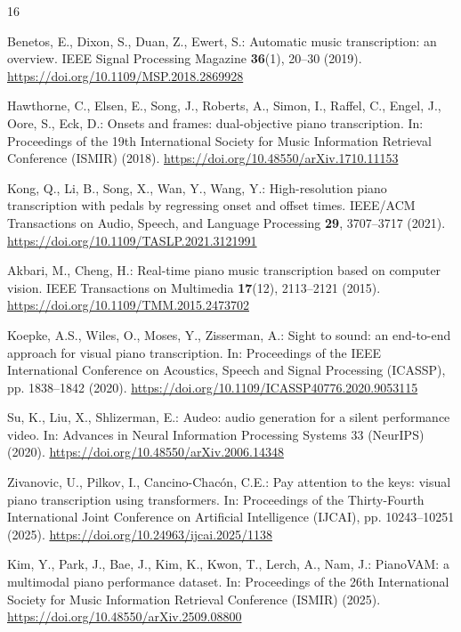\documentclass[pdflatex,sn-mathphys-num]{sn-jnl}
\begin{document}
\begin{thebibliography}{16}

Benetos, E., Dixon, S., Duan, Z., Ewert, S.: Automatic music transcription: an overview. IEEE Signal Processing Magazine \textbf{36}(1), 20--30 (2019). \url{https://doi.org/10.1109/MSP.2018.2869928}

Hawthorne, C., Elsen, E., Song, J., Roberts, A., Simon, I., Raffel, C., Engel, J., Oore, S., Eck, D.: Onsets and frames: dual-objective piano transcription. In: Proceedings of the 19th International Society for Music Information Retrieval Conference (ISMIR) (2018). \url{https://doi.org/10.48550/arXiv.1710.11153}

Kong, Q., Li, B., Song, X., Wan, Y., Wang, Y.: High-resolution piano transcription with pedals by regressing onset and offset times. IEEE/ACM Transactions on Audio, Speech, and Language Processing \textbf{29}, 3707--3717 (2021). \url{https://doi.org/10.1109/TASLP.2021.3121991}

Akbari, M., Cheng, H.: Real-time piano music transcription based on computer vision. IEEE Transactions on Multimedia \textbf{17}(12), 2113--2121 (2015). \url{https://doi.org/10.1109/TMM.2015.2473702}

Koepke, A.S., Wiles, O., Moses, Y., Zisserman, A.: Sight to sound: an end-to-end approach for visual piano transcription. In: Proceedings of the IEEE International Conference on Acoustics, Speech and Signal Processing (ICASSP), pp. 1838--1842 (2020). \url{https://doi.org/10.1109/ICASSP40776.2020.9053115}

Su, K., Liu, X., Shlizerman, E.: Audeo: audio generation for a silent performance video. In: Advances in Neural Information Processing Systems 33 (NeurIPS) (2020). \url{https://doi.org/10.48550/arXiv.2006.14348}

Zivanovic, U., Pilkov, I., Cancino-Chac\'{o}n, C.E.: Pay attention to the keys: visual piano transcription using transformers. In: Proceedings of the Thirty-Fourth International Joint Conference on Artificial Intelligence (IJCAI), pp. 10243--10251 (2025). \url{https://doi.org/10.24963/ijcai.2025/1138}

Kim, Y., Park, J., Bae, J., Kim, K., Kwon, T., Lerch, A., Nam, J.: PianoVAM: a multimodal piano performance dataset. In: Proceedings of the 26th International Society for Music Information Retrieval Conference (ISMIR) (2025). \url{https://doi.org/10.48550/arXiv.2509.08800}


\end{thebibliography}
\end{document}
